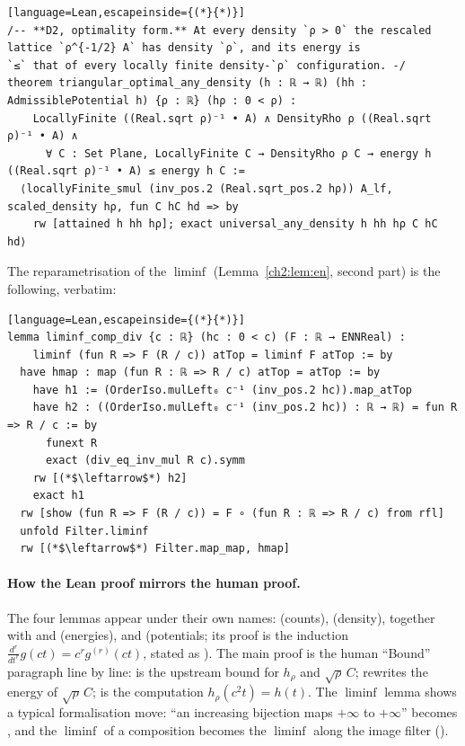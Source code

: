 \begin{leanbox}
\begin{lstlisting}[language=Lean,escapeinside={(*}{*)}]
/-- **D2, optimality form.** At every density `ρ > 0` the rescaled lattice `ρ^{-1/2} A` has density `ρ`, and its energy is
`≤` that of every locally finite density-`ρ` configuration. -/
theorem triangular_optimal_any_density (h : ℝ → ℝ) (hh : AdmissiblePotential h) {ρ : ℝ} (hρ : 0 < ρ) :
    LocallyFinite ((Real.sqrt ρ)⁻¹ • A) ∧ DensityRho ρ ((Real.sqrt ρ)⁻¹ • A) ∧
      ∀ C : Set Plane, LocallyFinite C → DensityRho ρ C → energy h ((Real.sqrt ρ)⁻¹ • A) ≤ energy h C :=
  ⟨locallyFinite_smul (inv_pos.2 (Real.sqrt_pos.2 hρ)) A_lf, scaled_density hρ, fun C hC hd => by
    rw [attained h hh hρ]; exact universal_any_density h hh hρ C hC hd⟩
\end{lstlisting}
The reparametrisation of the $\liminf$ (Lemma~\ref{ch2:lem:en}, second part) is the following, verbatim:
\begin{lstlisting}[language=Lean,escapeinside={(*}{*)}]
lemma liminf_comp_div {c : ℝ} (hc : 0 < c) (F : ℝ → ENNReal) :
    liminf (fun R => F (R / c)) atTop = liminf F atTop := by
  have hmap : map (fun R : ℝ => R / c) atTop = atTop := by
    have h1 := (OrderIso.mulLeft₀ c⁻¹ (inv_pos.2 hc)).map_atTop
    have h2 : ((OrderIso.mulLeft₀ c⁻¹ (inv_pos.2 hc)) : ℝ → ℝ) = fun R => R / c := by
      funext R
      exact (div_eq_inv_mul R c).symm
    rw [(*$\leftarrow$*) h2]
    exact h1
  rw [show (fun R => F (R / c)) = F ∘ (fun R : ℝ => R / c) from rfl]
  unfold Filter.liminf
  rw [(*$\leftarrow$*) Filter.map_map, hmap]
\end{lstlisting}
\end{leanbox}

\paragraph{How the Lean proof mirrors the human proof.} The four lemmas appear under their own names:
 (counts),  (density),  together with
 and  (energies), and  (potentials; its proof is the
induction $\frac{d^r}{dt^r}g(ct)=c^rg^{(r)}(ct)$, stated as ). The main proof is the
human ``Bound'' paragraph line by line:  is the upstream bound for $h_\rho$ and $\sqrt\rho\,C$;
 rewrites the energy of $\sqrt\rho\,C$;  is the computation $h_\rho(c^2t)=h(t)$. The
$\liminf$ lemma shows a typical formalisation move: ``an increasing bijection maps $+\infty$ to $+\infty$'' becomes
, and the $\liminf$ of a composition becomes the $\liminf$ along the image filter
().

